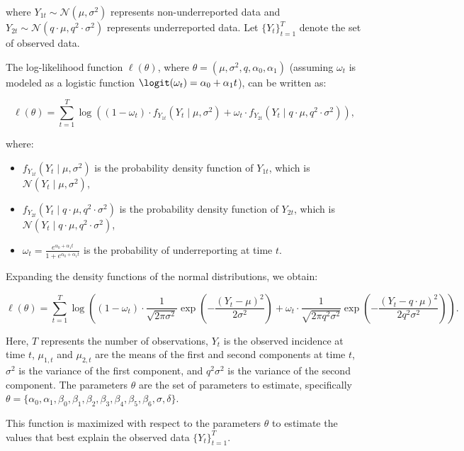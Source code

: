 \documentclass[acmsmall, nonacm]{acmart}
\begin{document}
where \( Y_{1t} \sim \mathcal{N}(\mu, \sigma^2) \) represents non-underreported data and \( Y_{2t} \sim \mathcal{N}(q \cdot \mu, q^2 \cdot \sigma^2) \) represents underreported data. Let \( \{Y_t\}_{t=1}^T \) denote the set of observed data.

The log-likelihood function \( \ell(\theta) \), where \( \theta = (\mu, \sigma^2, q, \alpha_0, \alpha_1) \) (assuming \( \omega_t \) is modeled as a logistic function \( \logit(\omega_t) = \alpha_0 + \alpha_1 t \)), can be written as:

\[
\ell(\theta) = \sum_{t=1}^T \log \left( (1 - \omega_t) \cdot f_{Y_{1t}}(Y_t \mid \mu, \sigma^2) + \omega_t \cdot f_{Y_{2t}}(Y_t \mid q \cdot \mu, q^2 \cdot \sigma^2) \right),
\]

where:
\begin{itemize}
    \item \( f_{Y_{1t}}(Y_t \mid \mu, \sigma^2) \) is the probability density function of \( Y_{1t} \), which is \( \mathcal{N}(Y_t \mid \mu, \sigma^2) \),
    \item \( f_{Y_{2t}}(Y_t \mid q \cdot \mu, q^2 \cdot \sigma^2) \) is the probability density function of \( Y_{2t} \), which is \( \mathcal{N}(Y_t \mid q \cdot \mu, q^2 \cdot \sigma^2) \),
    \item \( \omega_t = \frac{e^{\alpha_0 + \alpha_1 t}}{1 + e^{\alpha_0 + \alpha_1 t}} \) is the probability of underreporting at time \( t \).
\end{itemize}

Expanding the density functions of the normal distributions, we obtain:

\[
\ell(\theta) = \sum_{t=1}^T \log \left( (1 - \omega_t) \cdot \frac{1}{\sqrt{2 \pi \sigma^2}} \exp\left(-\frac{(Y_t - \mu)^2}{2 \sigma^2}\right) + \omega_t \cdot \frac{1}{\sqrt{2 \pi q^2 \sigma^2}} \exp\left(-\frac{(Y_t - q \cdot \mu)^2}{2 q^2 \sigma^2}\right) \right).
\]

Here, \( T \) represents the number of observations, \( Y_t \) is the observed incidence at time \( t \), \( \mu_{1,t} \) and \( \mu_{2,t} \) are the means of the first and second components at time \( t \), \( \sigma^2 \) is the variance of the first component, and \( q^2 \sigma^2 \) is the variance of the second component. The parameters \( \theta \) are the set of parameters to estimate, specifically \( \theta = \{\alpha_0, \alpha_1, \beta_0, \beta_1, \beta_2, \beta_3, \beta_4, \beta_5, \beta_6, \sigma, \delta\} \).

This function is maximized with respect to the parameters \( \theta \) to estimate the values that best explain the observed data \( \{Y_t\}_{t=1}^T \).
\end{document}

